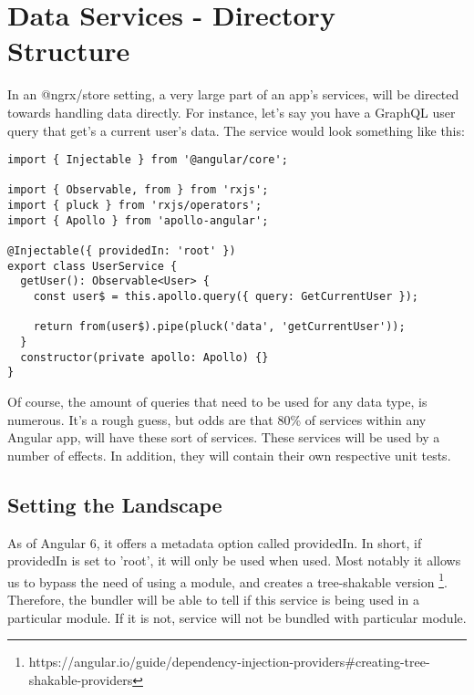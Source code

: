 \maketitle{}
\section{ Data Services - Directory Structure }

In an @ngrx/store setting, a very large part of an app's services, will be
directed towards handling data directly. For instance, let's say you have a
GraphQL user query that get's a current user's data. The service would look
something like this:
\begin{lstlisting}
import { Injectable } from '@angular/core';

import { Observable, from } from 'rxjs';
import { pluck } from 'rxjs/operators';
import { Apollo } from 'apollo-angular';

@Injectable({ providedIn: 'root' })
export class UserService {
  getUser(): Observable<User> {
    const user$ = this.apollo.query({ query: GetCurrentUser });

    return from(user$).pipe(pluck('data', 'getCurrentUser'));
  }
  constructor(private apollo: Apollo) {}
}
\end{lstlisting}

Of course, the amount of queries that need to be used for any data type, is
numerous. It's a rough guess, but odds are that 80\% of services within any
Angular app, will have these sort of services. These services will be used by a
number of effects. In addition, they will contain their own respective unit
tests.

\subsection{ Setting the Landscape }
As of Angular 6, it offers a metadata option called providedIn. In short, if
providedIn is set to 'root', it will only be used when used. Most notably it
allows us to bypass the need of using a module, and creates a tree-shakable
version \footnote{https://angular.io/guide/dependency-injection-providers\#creating-tree-shakable-providers}.
Therefore, the bundler will be able to tell if this service is being used in a
particular module. If it is not, service will not be bundled with particular
module.
